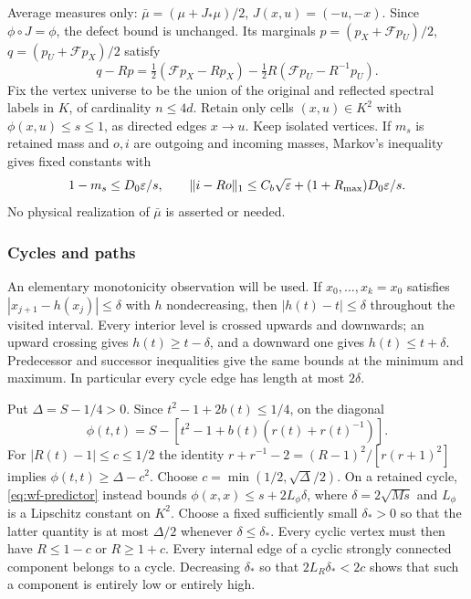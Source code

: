 Average measures only:
$\bar\mu=(\mu+J_*\mu)/2$, $J(x,u)=(-u,-x)$. Since
$\phi\circ J=\phi$, the defect bound is unchanged. Its marginals
$p=(p_X+\mathcal Fp_U)/2$, $q=(p_U+\mathcal Fp_X)/2$ satisfy
\[
 q-Rp=\tfrac12(\mathcal Fp_X-Rp_X)
       -\tfrac12R(\mathcal Fp_U-R^{-1}p_U).
\]
Fix the vertex universe to be the union of the original and reflected
spectral labels in $K$, of cardinality $n\le4d$. Retain only cells
$(x,u)\in K^2$ with $\phi(x,u)\le s\le1$, as directed edges $x\to u$.
Keep isolated vertices. If $m_s$ is retained mass and $o,i$ are outgoing
and incoming masses, Markov's inequality gives fixed constants with
\begin{equation}\label{eq:wf-balance}
 1-m_s\le D_0\varepsilon/s,\qquad
 \|i-Ro\|_1\le C_b\sqrt{\varepsilon}+(1+R_{\max})D_0\varepsilon/s.
\end{equation}
No physical realization of $\bar\mu$ is asserted or needed.

\subsubsection*{Cycles and paths}

An elementary monotonicity observation will be used. If
$x_0,\ldots,x_k=x_0$ satisfies $|x_{j+1}-h(x_j)|\le\delta$ with
$h$ nondecreasing, then $|h(t)-t|\le\delta$ throughout the visited
interval. Every interior level is crossed upwards and downwards; an
upward crossing gives $h(t)\ge t-\delta$, and a downward one gives
$h(t)\le t+\delta$. Predecessor and successor inequalities give the
same bounds at the minimum and maximum. In particular every cycle edge
has length at most $2\delta$.

Put $\Delta=S-1/4>0$. Since $t^2-1+2b(t)\le1/4$, on the diagonal
\[
 \phi(t,t)=S-[t^2-1+b(t)(r(t)+r(t)^{-1})].
\]
For $|R(t)-1|\le c\le1/2$ the identity
$r+r^{-1}-2=(R-1)^2/[r(r+1)^2]$ implies
$\phi(t,t)\ge\Delta-c^2$. Choose
$c=\min(1/2,\sqrt\Delta/2)$. On a retained cycle,
\eqref{eq:wf-predictor} instead bounds
$\phi(x,x)\le s+2L_\phi\delta$, where
$\delta=2\sqrt{Ms}$ and $L_\phi$ is a Lipschitz constant on $K^2$.
Choose a fixed sufficiently small $\delta_*>0$ so that the latter
quantity is at most $\Delta/2$ whenever $\delta\le\delta_*$.
Every cyclic vertex must then have $R\le1-c$ or $R\ge1+c$.
Every internal edge of a cyclic strongly connected component belongs
to a cycle. Decreasing $\delta_*$ so that $2L_R\delta_*<2c$ shows
that such a component is entirely low or entirely high.

